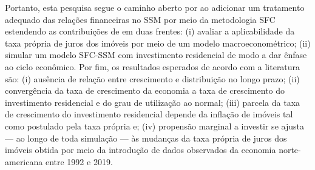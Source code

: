 Portanto, esta pesquisa segue o caminho aberto por \textcite{brochier_supermultiplier_2018} ao adicionar um tratamento adequado das relações financeiras no SSM por meio da metodologia SFC estendendo as contribuições de \textcite{teixeira_crescimento_2015} em duas frentes:
(i) avaliar a aplicabilidade da taxa própria de juros dos imóveis por meio de um modelo macroeconométrico;
(ii) simular um modelo SFC-SSM com investimento residencial de modo a dar ênfase ao ciclo econômico.
Por fim, os resultados esperados de acordo com a literatura são:
(i) ausência de relação entre crescimento e distribuição no longo prazo; (ii) convergência
da taxa de crescimento da economia a taxa de crescimento do investimento residencial
e do grau de utilização ao normal; (iii) parcela da taxa de crescimento do investimento residencial depende da inflação de imóveis tal como postulado pela taxa própria e; (iv) propensão marginal a investir se ajusta --- ao longo de toda simulação --- às mudanças da taxa própria de juros dos imóveis obtida por meio da introdução de dados observados da  economia norte-americana entre 1992 e 2019.
 









